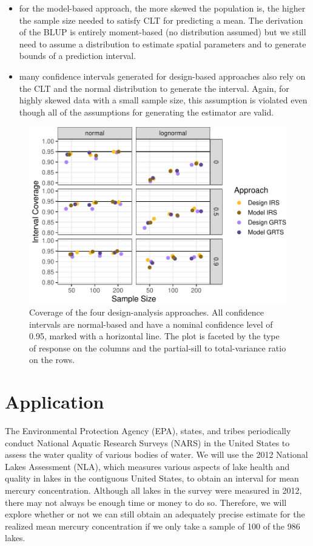 \documentclass[]{elsarticle} %
\providecommand{\tightlist}{%
  \setlength{\itemsep}{0pt}\setlength{\parskip}{0pt}}
\begin{document}
\begin{itemize}
\tightlist
\item
  for the model-based approach, the more skewed the population is, the
  higher the sample size needed to satisfy CLT for predicting a mean.
  The derivation of the BLUP is entirely moment-based (no distribution
  assumed) but we still need to assume a distribution to estimate
  spatial parameters and to generate bounds of a prediction interval.
\item
  many confidence intervals generated for design-based approaches also
  rely on the CLT and the normal distribution to generate the interval.
  Again, for highly skewed data with a small sample size, this
  assumption is violated even though all of the assumptions for
  generating the estimator are valid.
\end{itemize}

\begin{figure}
\includegraphics[width=1\linewidth]{SpatialDVM_Manuscript_files/figure-latex/figconf-1} \caption{Coverage of the four design-analysis approaches. All confidence intervals are normal-based and have a nominal confidence level of 0.95, marked with a horizontal line. The plot is faceted by the type of response on the columns and the partial-sill to total-variance ratio on the rows.}\label{fig:figconf}
\end{figure}

\hypertarget{application}{%
\section{Application}\label{application}}

The Environmental Protection Agency (EPA), states, and tribes
periodically conduct National Aquatic Research Surveys (NARS) in the
United States to assess the water quality of various bodies of water. We
will use the 2012 National Lakes Assessment (NLA), which measures
various aspects of lake health and quality in lakes in the contiguous
United States, to obtain an interval for mean mercury concentration.
Although all lakes in the survey were measured in 2012, there may not
always be enough time or money to do so. Therefore, we will explore
whether or not we can still obtain an adequately precise estimate for
the realized mean mercury concentration if we only take a sample of 100
of the 986 lakes.
\end{document}
